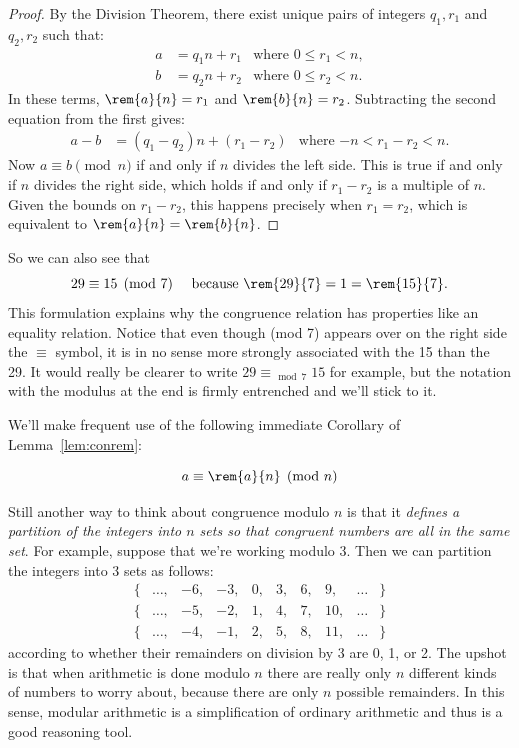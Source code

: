 \begin{proof}
By the Division Theorem, there exist unique pairs of integers $q_1, r_1$
and $q_2, r_2$ such that:
%
\begin{align*}
a & = q_1 n + r_1 & \text{where $0 \leq r_1 < n$}, \\
b & = q_2 n + r_2 & \text{where $0 \leq r_2 < n$}.
\end{align*}
%
In these terms, $\rem{a}{n} = r_1$ and $\rem{b}{n} = r_2$.
Subtracting the second equation from the first gives:
%
\begin{align*}
a - b & = (q_1 - q_2) n + (r_1 - r_2)
  & \text{where $-n < r_1 - r_2 < n$}.
\end{align*}
%
Now $a \equiv b \pmod{n}$ if and only if $n$ divides the left side.
This is true if and only if $n$ divides the right side, which holds if
and only if $r_1 - r_2$ is a multiple of $n$.  Given the bounds on
$r_1 - r_2$, this happens precisely when $r_1 = r_2$, which is
equivalent to $\rem{a}{n} = \rem{b}{n}$.
\end{proof}

So we can also see that
\[
29 \equiv 15 \pmod{7} \quad\text{ because } \rem{29}{7} = 1 = \rem{15}{7}.
\]
This formulation explains why the congruence relation has properties like
an equality relation.  Notice that even though (mod 7) appears over on the
right side the $\equiv$ symbol, it is in no sense more strongly associated
with the 15 than the 29.  It would really be clearer to write $29
\equiv_{\mod 7} 15$ for example, but the notation with the modulus at the
end is firmly entrenched and we'll stick to it.

We'll make frequent use of the following immediate Corollary of
Lemma~\ref{lem:conrem}:
\begin{corollary}\label{aran}
\[
a \equiv \rem{a}{n} \pmod{n}
\]
\end{corollary}

Still another way to think about congruence modulo $n$ is that it
\emph{defines a partition of the integers into $n$ sets so that congruent
numbers are all in the same set}.  For example, suppose that we're working
modulo 3.  Then we can partition the integers into 3 sets as follows:
%
\[
\begin{array}{cccccccccc}
\{ & \dots, & -6, & -3, & 0, & 3, & 6, & 9, & \dots & \} \\
\{ & \dots, & -5, & -2, & 1, & 4, & 7, & 10, & \dots & \} \\
\{ & \dots, & -4, & -1, & 2, & 5, & 8, & 11, & \dots & \}
\end{array}
\]
according to whether their remainders on division by 3 are 0, 1, or 2.
The upshot is that when arithmetic is done modulo $n$ there are really
only $n$ different kinds of numbers to worry about, because there are only
$n$ possible remainders.  In this sense, modular arithmetic is a
simplification of ordinary arithmetic and thus is a good reasoning tool.

